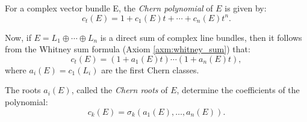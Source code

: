 \documentclass[11pt]{homework}
\theoremstyle{indented}
\begin{document}
\begin{definition}
    For a complex vector bundle E, the \textit{Chern polynomial} of $E$ is given by:
    \begin{equation*}
        c_{t}(E)=1+c_{1}(E)t+\cdots +c_{n}(E)t^{n}.
    \end{equation*}

    Now, if $E=L_{1}\oplus \cdots \oplus L_{n}$ is a direct sum of complex line bundles, then it follows from the Whitney sum formula (Axiom \ref{axm:whitney_sum}) that:
    \begin{equation*}
        c_{t}(E)=(1+a_{1}(E)t)\cdots (1+a_{n}(E)t),
    \end{equation*}
    where $a_{i}(E)=c_{1}(L_{i})$ are the first Chern classes.

    The roots $a_{i}(E)$, called the \textit{Chern roots} of $E$, determine the coefficients of the polynomial:
    \begin{equation*}
        c_{k}(E)=\sigma _{k}(a_{1}(E),\ldots ,a_{n}(E)).
    \end{equation*}
\end{definition}
\end{document}

